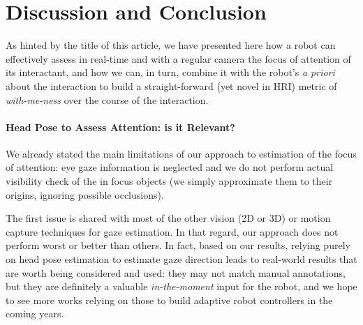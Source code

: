\documentclass{sig-alternate}
\begin{document}



\section{Discussion and Conclusion}

As hinted by the title of this article, we have presented here how a robot can
effectively assess in real-time and with a regular camera the focus of attention
of its interactant, and how we can, in turn, combine it with the robot's {\it a priori}
about the interaction to build a straight-forward (yet novel in HRI) metric of
\emph{with-me-ness} over the course of the interaction.

\paragraph{Head Pose to Assess Attention: is it Relevant?}

%

We already stated the main limitations of our approach to estimation of the
focus of attention: eye gaze information is neglected and we do not perform
actual visibility check of the in focus objects (we simply approximate them to
their origins, ignoring possible occlusions).

The first issue is shared with most of the other vision (2D or 3D) or motion
capture techniques for gaze estimation. In that regard, our approach does not
perform worst or better than others. In fact, based on our results, relying
purely on head pose estimation to estimate gaze direction leads to real-world
results that are worth being considered and used: they may not match manual
annotations, but they are definitely a valuable \emph{in-the-moment} input for
the robot, and we hope to see more works relying on those to build adaptive
robot controllers in the coming years.
\end{document}
